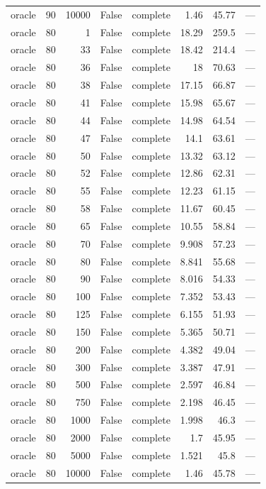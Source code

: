 \begin{tabular}{lrrrlrrl}
oracle & 90 & 10000 & False & complete & 1.46 & 45.77 & — \\
oracle & 80 & 1 & False & complete & 18.29 & 259.5 & — \\
oracle & 80 & 33 & False & complete & 18.42 & 214.4 & — \\
oracle & 80 & 36 & False & complete & 18 & 70.63 & — \\
oracle & 80 & 38 & False & complete & 17.15 & 66.87 & — \\
oracle & 80 & 41 & False & complete & 15.98 & 65.67 & — \\
oracle & 80 & 44 & False & complete & 14.98 & 64.54 & — \\
oracle & 80 & 47 & False & complete & 14.1 & 63.61 & — \\
oracle & 80 & 50 & False & complete & 13.32 & 63.12 & — \\
oracle & 80 & 52 & False & complete & 12.86 & 62.31 & — \\
oracle & 80 & 55 & False & complete & 12.23 & 61.15 & — \\
oracle & 80 & 58 & False & complete & 11.67 & 60.45 & — \\
oracle & 80 & 65 & False & complete & 10.55 & 58.84 & — \\
oracle & 80 & 70 & False & complete & 9.908 & 57.23 & — \\
oracle & 80 & 80 & False & complete & 8.841 & 55.68 & — \\
oracle & 80 & 90 & False & complete & 8.016 & 54.33 & — \\
oracle & 80 & 100 & False & complete & 7.352 & 53.43 & — \\
oracle & 80 & 125 & False & complete & 6.155 & 51.93 & — \\
oracle & 80 & 150 & False & complete & 5.365 & 50.71 & — \\
oracle & 80 & 200 & False & complete & 4.382 & 49.04 & — \\
oracle & 80 & 300 & False & complete & 3.387 & 47.91 & — \\
oracle & 80 & 500 & False & complete & 2.597 & 46.84 & — \\
oracle & 80 & 750 & False & complete & 2.198 & 46.45 & — \\
oracle & 80 & 1000 & False & complete & 1.998 & 46.3 & — \\
oracle & 80 & 2000 & False & complete & 1.7 & 45.95 & — \\
oracle & 80 & 5000 & False & complete & 1.521 & 45.8 & — \\
oracle & 80 & 10000 & False & complete & 1.46 & 45.78 & — \\

\end{tabular}
